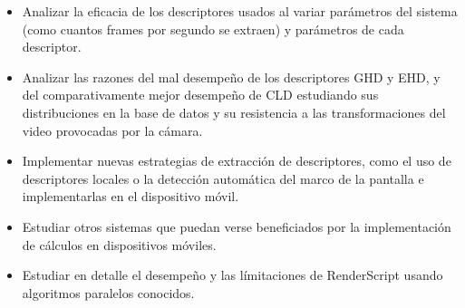 \begin{itemize}
\item Analizar la eficacia de los descriptores usados al variar parámetros del sistema (como cuantos frames por segundo se extraen) y parámetros de cada descriptor.
\item Analizar las razones del mal desempeño de los descriptores GHD y EHD, y del comparativamente mejor desempeño de CLD estudiando sus distribuciones en la base de datos y su resistencia a las transformaciones del video provocadas por la cámara.
\item Implementar nuevas estrategias de extracción de descriptores, como el uso de descriptores locales o la detección automática del marco de la pantalla e implementarlas en el dispositivo móvil.
\item Estudiar otros sistemas que puedan verse beneficiados por la implementación de cálculos en dispositivos móviles.
\item Estudiar en detalle el desempeño y las límitaciones de RenderScript usando algoritmos paralelos conocidos.
\end{itemize}

